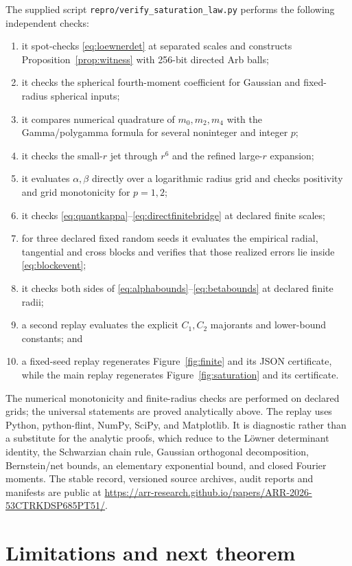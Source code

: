 \documentclass[11pt]{article}
\begin{document}
The supplied script \texttt{repro/verify\_saturation\_law.py} performs the following independent checks:
\begin{enumerate}[leftmargin=2em]
 \item it spot-checks \eqref{eq:loewnerdet} at separated scales and constructs Proposition~\ref{prop:witness} with
 256-bit directed Arb balls;
 \item it checks the spherical fourth-moment coefficient for Gaussian and fixed-radius spherical inputs;
 \item it compares numerical quadrature of $m_0,m_2,m_4$ with the Gamma/polygamma formula for several
 noninteger and integer $p$;
 \item it checks the small-$r$ jet through $r^6$ and the refined large-$r$ expansion;
 \item it evaluates $\alpha,\beta$ directly over a logarithmic radius grid and checks positivity and grid
 monotonicity for $p=1,2$;
 \item it checks \eqref{eq:quantkappa}--\eqref{eq:directfinitebridge} at declared finite scales;
 \item for three declared fixed random seeds it evaluates the empirical radial, tangential and cross blocks and
 verifies that those realized errors lie inside \eqref{eq:blockevent};
 \item it checks both sides of \eqref{eq:alphabounds}--\eqref{eq:betabounds} at declared finite radii;
 \item a second replay evaluates the explicit $C_1,C_2$ majorants and lower-bound constants; and
 \item a fixed-seed replay regenerates Figure~\ref{fig:finite} and its JSON certificate, while the main replay
 regenerates Figure~\ref{fig:saturation} and its certificate.
\end{enumerate}
The numerical monotonicity and finite-radius checks are performed on declared grids; the universal statements are
proved analytically above.  The replay uses Python, python-flint, NumPy, SciPy, and Matplotlib.  It is diagnostic
rather than a substitute for
the analytic proofs, which reduce to the L\"owner determinant identity, the Schwarzian chain rule, Gaussian
orthogonal decomposition, Bernstein/net bounds, an elementary exponential bound, and closed Fourier moments.
The stable record, versioned source archives, audit reports and manifests are public at
\url{https://arr-research.github.io/papers/ARR-2026-53CTRKDSP685PT51/}.

\section{Limitations and next theorem}
\end{document}
